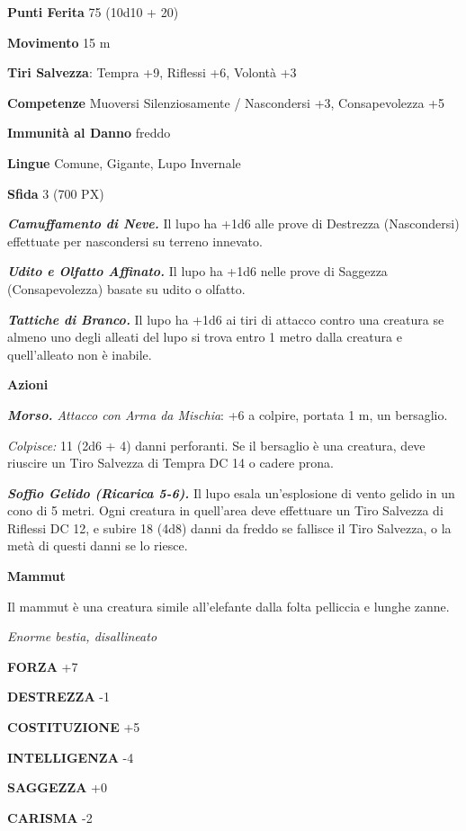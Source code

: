 \begin{multicols}{2}
	\textbf{Punti Ferita} 75 (10d10 + 20)

	\textbf{Movimento} 15 m

	\textbf{Tiri Salvezza}: Tempra +9, Riflessi +6, Volontà +3

	\textbf{Competenze} Muoversi Silenziosamente / Nascondersi +3, Consapevolezza +5

	\textbf{Immunità al Danno} freddo

	\textbf{Lingue} Comune, Gigante, Lupo Invernale

	\textbf{Sfida} 3 (700 PX)

	\textit{\textbf{Camuffamento di Neve.}} Il lupo ha +1d6 alle prove di Destrezza (Nascondersi) effettuate per nascondersi su terreno innevato.

	\textit{\textbf{Udito e Olfatto Affinato.}} Il lupo ha +1d6 nelle prove di Saggezza (Consapevolezza) basate su udito o olfatto.

	\textit{\textbf{Tattiche di Branco.}} Il lupo ha +1d6 ai tiri di attacco contro una creatura se almeno uno degli alleati del lupo si trova entro 1 metro dalla creatura e quell'alleato non è inabile.

	\textbf{Azioni}

	\textit{\textbf{Morso.} Attacco con Arma da Mischia}: +6 a colpire, portata 1 m, un bersaglio.

	\textit{Colpisce:} 11 (2d6 + 4) danni perforanti. Se il bersaglio è una creatura, deve riuscire un Tiro Salvezza di Tempra DC 14 o cadere prona.

	\textit{\textbf{Soffio Gelido (Ricarica 5-6).}} Il lupo esala un'esplosione di vento gelido in un cono di 5 metri. Ogni creatura in quell'area deve effettuare un Tiro Salvezza di Riflessi DC 12, e subire 18 (4d8) danni da freddo se fallisce il Tiro Salvezza, o la metà di questi danni se lo riesce.

	\medskip\textbf{Mammut}

	Il mammut è una creatura simile all'elefante dalla folta pelliccia e lunghe zanne.

	\textit{Enorme bestia, disallineato}

	\textbf{FORZA} +7

	\textbf{DESTREZZA} -1

	\textbf{COSTITUZIONE} +5

	\textbf{INTELLIGENZA} -4

	\textbf{SAGGEZZA} +0

	\textbf{CARISMA} -2


\end{multicols}
